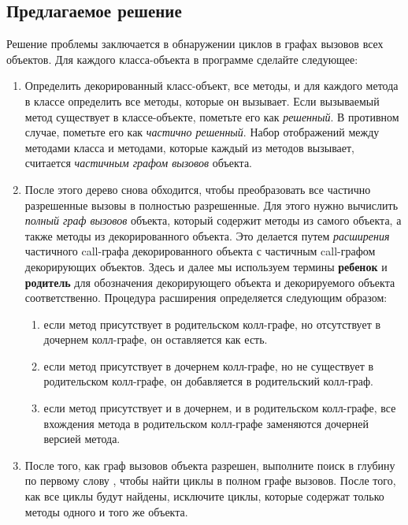 \subsection{Предлагаемое решение}
\label{impl:mutualrec_algo}
Решение проблемы заключается в обнаружении циклов в графах вызовов всех объектов. Для каждого класса-объекта в программе сделайте следующее:
\begin{enumerate}
    \item Определить декорированный класс-объект, все методы, и для каждого метода в классе определить все методы, которые он вызывает. Если вызываемый метод существует в классе-объекте, пометьте его как \textit{решенный}. В противном случае, пометьте его как \textit{частично решенный}. Набор отображений между методами класса и методами, которые каждый из методов вызывает, считается \textit{частичным графом вызовов} объекта.
    \item После этого дерево снова обходится, чтобы преобразовать все частично разрешенные вызовы в полностью разрешенные. Для этого нужно вычислить \textit{полный граф вызовов} объекта, который содержит методы из самого объекта, а также методы из декорированного объекта. Это делается путем \textit{расширения} частичного call-графа декорированного объекта с частичным call-графом декорирующих объектов. Здесь и далее мы используем термины \textbf{ребенок} и \textbf{родитель} для обозначения декорирующего объекта и декорируемого объекта соответственно. Процедура расширения определяется следующим образом:
          \begin{enumerate}
              \item если метод присутствует в родительском колл-графе, но отсутствует в дочернем колл-графе, он оставляется как есть.
              \item если метод присутствует в дочернем колл-графе, но не существует в родительском колл-графе, он добавляется в родительский колл-граф.
              \item если метод присутствует и в дочернем, и в родительском колл-графе, все вхождения метода в родительском колл-графе заменяются дочерней версией метода.
          \end{enumerate}
    \item После того, как граф вызовов объекта разрешен, выполните поиск в глубину по первому слову \cite{dfs}, чтобы найти циклы в полном графе вызовов. После того, как все циклы будут найдены, исключите циклы, которые содержат только методы одного и того же объекта.
\end{enumerate}

